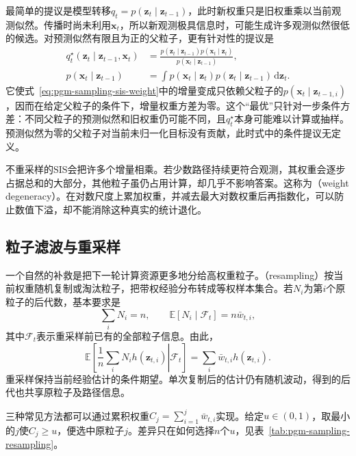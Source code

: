 最简单的提议是模型转移$q_t=p(\bm{z}_t\mid\bm{z}_{t-1})$，此时新权重只是旧权重乘以当前观测似然。传播时尚未利用$\bm{x}_t$，所以新观测极具信息时，可能生成许多观测似然很低的候选。对预测似然有限且为正的父粒子，更有针对性的提议是
\begin{equation}
  \begin{aligned}
    q_t^\star(\bm{z}_t\mid\bm{z}_{t-1},\bm{x}_t)
      &=\frac{p(\bm{z}_t\mid\bm{z}_{t-1})
                p(\bm{x}_t\mid\bm{z}_t)}
              {p(\bm{x}_t\mid\bm{z}_{t-1})},\\
    p(\bm{x}_t\mid\bm{z}_{t-1})
      &=\int p(\bm{x}_t\mid\bm{z}_t)
             p(\bm{z}_t\mid\bm{z}_{t-1})\,\mathrm{d}\bm{z}_t.
  \end{aligned}
  \label{eq:pgm-sampling-optimal-proposal}
\end{equation}
它使式~\eqref{eq:pgm-sampling-sis-weight}中的增量变成只依赖父粒子的$p(\bm{x}_t\mid\bm{z}_{t-1,i})$，因而在给定父粒子的条件下，增量权重方差为零。这个“最优”只针对一步条件方差：不同父粒子的预测似然和旧权重仍可能不同，且$q_t^\star$本身可能难以计算或抽样。预测似然为零的父粒子对当前未归一化目标没有贡献，此时式中的条件提议无定义。

不重采样的SIS会把许多个增量相乘。若少数路径持续更符合观测，其权重会逐步占据总和的大部分，其他粒子虽仍占用计算，却几乎不影响答案。这称为（weight degeneracy）。在对数尺度上累加权重，并减去最大对数权重后再指数化，可以防止数值下溢，却不能消除这种真实的统计退化。

\subsection{粒子滤波与重采样}
\label{sec:pgm-sampling-particle-filter}

一个自然的补救是把下一轮计算资源更多地分给高权重粒子。（resampling）按当前权重随机复制或淘汰粒子，把带权经验分布转成等权样本集合。若$N_i$为第$i$个原粒子的后代数，基本要求是
\begin{equation}
  \sum_i N_i=n,\qquad
  \mathbb{E}[N_i\mid\mathcal{F}_t]=n\bar w_{t,i},
  \label{eq:pgm-sampling-offspring}
\end{equation}
其中$\mathcal{F}_t$表示重采样前已有的全部粒子信息。由此，
\[
  \mathbb{E}\left[
     \left.\frac1n\sum_i N_i h(\bm{z}_{t,i})\right|\mathcal{F}_t
  \right]
    =\sum_i\bar w_{t,i}h(\bm{z}_{t,i}).
\]
重采样保持当前经验估计的条件期望。单次复制后的估计仍有随机波动，得到的后代也共享原粒子及路径信息。

三种常见方法都可以通过累积权重$C_j=\sum_{i=1}^{j}\bar w_{t,i}$实现。给定$u\in(0,1)$，取最小的$j$使$C_j\geq u$，便选中原粒子$j$。差异只在如何选择$n$个$u$，见表~\ref{tab:pgm-sampling-resampling}。

